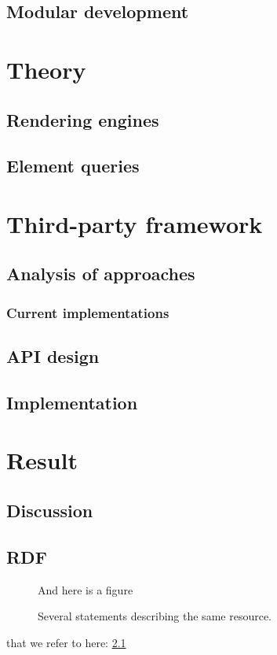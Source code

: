 \documentclass[a4paper,11pt]{kth-mag}
\begin{document}
\chapter{Modular development}

\part{Theory}

\chapter{Rendering engines}

\chapter{Element queries}

\part{Third-party framework}

\chapter{Analysis of approaches}

\section{Current implementations}

\chapter{API design}

\chapter{Implementation}

\part{Result}
\chapter{Discussion}

\appendix
\addappheadtotoc
\chapter{RDF}\label{appA}

\begin{figure}[ht]
\begin{center}
And here is a figure
\caption{\small{Several statements describing the same resource.}}\label{RDF_4}
\end{center}
\end{figure}

that we refer to here: \ref{RDF_4}
\end{document}
